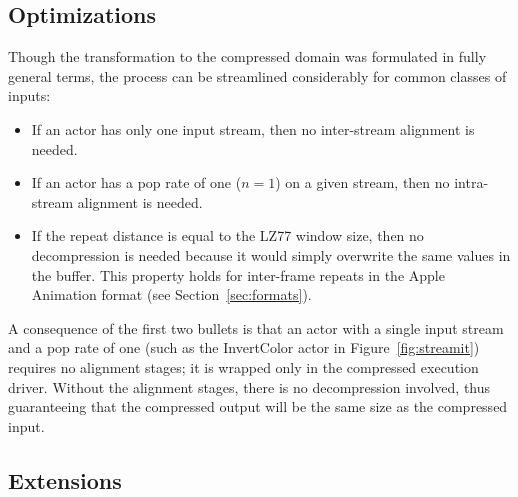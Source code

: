 \subsection{Optimizations}
\label{sec:opt}

Though the transformation to the compressed domain was formulated in
fully general terms, the process can be streamlined considerably for
common classes of inputs:
\begin{itemize}
\item If an actor has only one input stream, then no inter-stream
alignment is needed.
\item If an actor has a pop rate of one ($n=1$) on a given stream,
then no intra-stream alignment is needed.
\item If the repeat distance is equal to the LZ77 window size, then no
decompression is needed because it would simply overwrite the same
values in the buffer.  This property holds for inter-frame repeats in
the Apple Animation format (see Section~\ref{sec:formats}).
\end{itemize}
A consequence of the first two bullets is that an actor with a single
input stream and a pop rate of one (such as the InvertColor actor in
Figure~\ref{fig:streamit}) requires no alignment stages; it is wrapped
only in the compressed execution driver.  Without the alignment
stages, there is no decompression involved, thus guaranteeing that the
compressed output will be the same size as the compressed input.

\subsection{Extensions}

